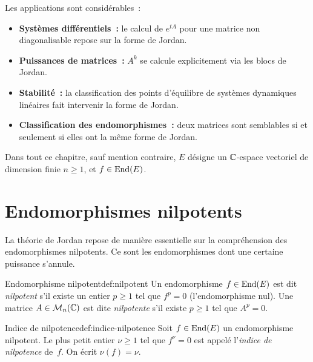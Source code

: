 Les applications sont considérables~:
\begin{itemize}
  \item \textbf{Systèmes différentiels~:}
    le calcul de $e^{tA}$ pour une matrice non diagonalisable repose sur
    la forme de Jordan.
  \item \textbf{Puissances de matrices~:}
    $A^k$ se calcule explicitement via les blocs de Jordan.
  \item \textbf{Stabilité~:} la classification des
    points d'équilibre de systèmes dynamiques linéaires fait intervenir
    la forme de Jordan.
  \item \textbf{Classification des endomorphismes~:} deux matrices sont
    semblables si et seulement si elles ont la même forme de Jordan.
\end{itemize}

\medskip

Dans tout ce chapitre, sauf mention contraire, $E$ désigne un
${\mathbb{C}}$-espace vectoriel de dimension finie $n\geq 1$, et
$f\in\operatorname{End}(E)$.


\section{Endomorphismes nilpotents}\label{sec:nilpotent}

La théorie de Jordan repose de manière essentielle sur la compréhension
des endomorphismes nilpotents. Ce sont les endomorphismes dont une
certaine puissance s'annule.

\begin{definition}{Endomorphisme nilpotent}{def:nilpotent}
  Un endomorphisme $f\in\operatorname{End}(E)$ est dit
  \emph{nilpotent} s'il existe un entier
  $p\geq 1$ tel que $f^p=0$ (l'endomorphisme nul). Une matrice
  $A\in\mathcal{M}_n({\mathbb{C}})$ est dite \emph{nilpotente}
  s'il existe $p\geq 1$ tel que $A^p=0$.
\end{definition}

\begin{definition}{Indice de nilpotence}{def:indice-nilpotence}
  Soit $f\in\operatorname{End}(E)$ un endomorphisme nilpotent. Le plus petit entier
  $\nu\geq 1$ tel que $f^\nu=0$ est appelé l'\emph{indice de
  nilpotence} de~$f$. On écrit $\nu(f)=\nu$.
\end{definition}

